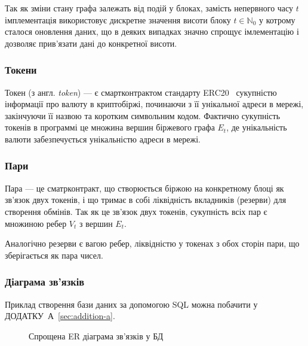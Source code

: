 \documentclass[14pt]{extarticle}
\begin{document}
Так як зміни стану графа залежать від подій у блоках, замість непервного часу
$t$ імплементація використовує дискретне значення висоти блоку $t \in \mathbb{N}_{0}$ у котрому
сталося оновлення даних, що в деяких випадках значно спрощує імлементацію і
дозволяє прив'язати дані до конкретної висоти.

\subsubsection{Токени}

Токен (з англ. \textit{token}) --- є смартконтрактом стандарту ERC20~\cite{erc20}
сукупністю інформації про валюту в криптобіржі, починаючи з її унікальної адреси
в мережі, закінчуючи її назвою та коротким символьним кодом. Фактично сукупність
токенів в программі це множина вершин біржевого графа $E_{t}$, де унікальність
валюти забезпечується унікальністю адреси в мережі.

\subsubsection{Пари}

Пара --- це сматрконтракт, що створюється біржою на конкретному блоці як зв'язок
двух токенів, і що тримає в собі ліквідність вкладників (резерви) для створення
обмінів. Так як це зв'язок двух токенів, сукупність всіх пар є множиною ребер
$V_{t}$ з вершин $E_{t}$.

Аналогічно резерви є вагою ребер, ліквідністю у токенах з обох сторін пари, що
зберігається як пара чисел.

\subsubsection{Діаграма зв'язків}

Приклад створення бази даних за допомогою SQL можна побачити у
ДОДАТКУ~А~\ref{sec:addition-a}.

\begin{figure}[ht]
  \centering
  \caption{\label{fig:label}Спрощена ER діаграма зв'язків у БД}
\end{figure}
\end{document}
